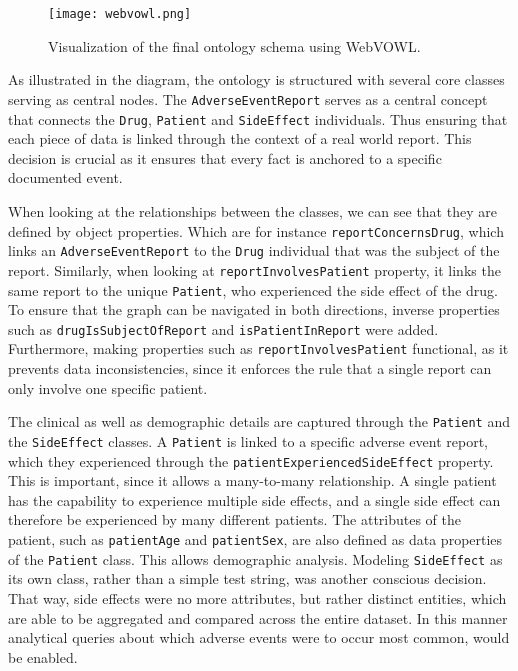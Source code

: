 \begin{figure}[H]
\centering
\texttt{[image: webvowl.png]} %
\caption{Visualization of the final ontology schema using WebVOWL.}
\label{fig:vowl_visualization}
\end{figure}

As illustrated in the diagram, the ontology is structured with several core classes serving as central nodes. The \texttt{Adverse\-Event\-Report} serves as a central concept that connects the \texttt{Drug}, \texttt{Patient} and \texttt{Side\-Effect} individuals. Thus ensuring that each piece of data is linked through the context of a real world report. This decision is crucial as it ensures that every fact is anchored to a specific documented event.

When looking at the relationships between the classes, we can see that they are defined by object properties. Which are for instance \texttt{report\-Concerns\-Drug}, which links an \texttt{Adverse\-Event\-Report} to the \texttt{Drug} individual that was the subject of the report. Similarly, when looking at \texttt{report\-Involves\-Patient} property, it links the same report to the unique \texttt{Patient}, who experienced the side effect of the drug. To ensure that the graph can be navigated in both directions, inverse properties such as \texttt{drug\-Is\-Subject\-Of\-Report} and \texttt{is\-Patient\-In\-Report} were added. Furthermore, making properties such as \texttt{report\-Involves\-Patient} functional, as it prevents data inconsistencies, since it enforces the rule that a single report can only involve one specific patient.

The clinical as well as demographic details are captured through the \texttt{Patient} and the \texttt{Side\-Effect} classes. A \texttt{Patient} is linked to a specific adverse event report, which they experienced through the \texttt{patient\-Experienced\-Side\-Effect} property. This is important, since it allows a many-to-many relationship. A single patient has the capability to experience multiple side effects, and a single side effect can therefore be experienced by many different patients. The attributes of the patient, such as \texttt{patient\-Age} and \texttt{patient\-Sex}, are also defined as data properties of the \texttt{Patient} class. This allows demographic analysis. Modeling \texttt{Side\-Effect} as its own class, rather than a simple test string, was another conscious decision. That way, side effects were no more attributes, but rather distinct entities, which are able to be aggregated and compared across the entire dataset. In this manner analytical queries about which adverse events were to occur most common, would be enabled.

